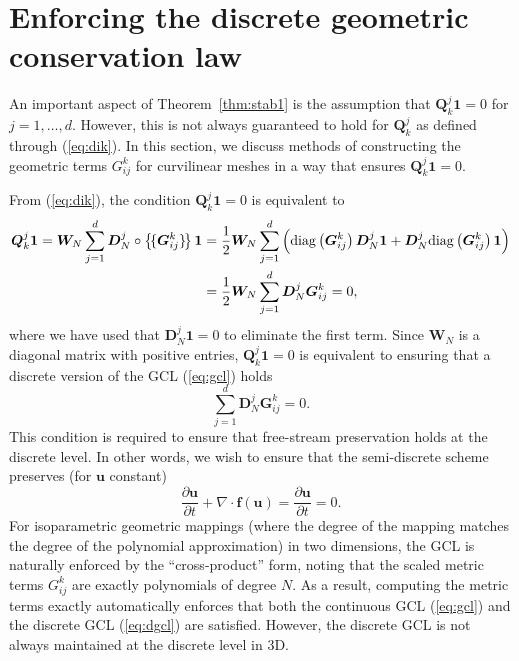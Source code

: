 \documentclass[10pt]{amsart}
\theoremstyle{definition}
\theoremstyle{lemma}
\theoremstyle{theorem}
\theoremstyle{assumption}
\newcommand{\pd}[2]{\frac{\partial#1}{\partial#2}}
\newcommand{\LRp}[1]{\left( #1 \right)}
\newcommand{\LRc}[1]{\left\{ #1 \right\}}
\newcommand{\avg}[1] {\ensuremath{\LRc{\!\{#1\}\!}}}
\newcommand{\Grad} {\ensuremath{\nabla}}
\newcommand{\diag}[1]{{\rm diag}\LRp{#1}}
\begin{document}
{\section{Enforcing the discrete geometric conservation law}
\label{sec:4}
An important aspect of Theorem~\ref{thm:stab1} is the assumption that $\bm{Q}^j_k\bm{1} = 0$ for $j = 1,\ldots,d$.  However, this is not always guaranteed to hold for $\bm{Q}^j_k$ as defined through (\ref{eq:dik}).  In this section, we discuss methods of constructing the geometric terms $G^k_{ij}$ for curvilinear meshes in a way that ensures $\bm{Q}^j_k\bm{1} = 0$.  

From (\ref{eq:dik}), the condition $\bm{Q}^j_k\bm{1} = 0$ is equivalent to
\begin{align*}
\bm{Q}^j_k\bm{1} = \bm{W}_N\sum_{j=1}^d\bm{D}^j_N\circ \avg{\bm{G}_{ij}^k}\bm{1} &= \frac{1}{2}\bm{W}_N\sum_{j=1}^d \LRp{ \diag{\bm{G}_{ij}^k}\bm{D}^j_N \bm{1} + \bm{D}^j_N\diag{\bm{G}_{ij}^k}\bm{1}} \\
&= \frac{1}{2}\bm{W}_N\sum_{j=1}^d \bm{D}^j_N \bm{G}_{ij}^k = 0,
\end{align*}
where we have used that $\bm{D}^j_N \bm{1} = 0$ to eliminate the first term.  Since $\bm{W}_N$ is a diagonal matrix with positive entries, $\bm{Q}^j_k\bm{1} = 0$ is equivalent to ensuring that a discrete version of the GCL (\ref{eq:gcl}) holds
\begin{equation}
\sum_{j=1}^d \bm{D}^j_N \bm{G}_{ij}^k = 0.
\label{eq:dgcl}
\end{equation}
This condition is required to ensure that free-stream preservation holds at the discrete level.  In other words, we wish to ensure that the semi-discrete scheme preserves (for $\bm{u}$ constant) 
\[
\pd{\bm{u}}{t} + \Grad \cdot \bm{f}(\bm{u}) = \pd{\bm{u}}{t} = 0.
\]
For isoparametric geometric mappings (where the degree of the mapping matches the degree of the polynomial approximation) in two dimensions, the GCL is naturally enforced by the ``cross-product'' form, noting that the scaled metric terms $G^k_{ij}$ are exactly polynomials of degree $N$.  As a result, computing the metric terms exactly automatically enforces that both the continuous GCL (\ref{eq:gcl}) and the discrete GCL (\ref{eq:dgcl}) are satisfied.  However, the discrete GCL is not always maintained at the discrete level in 3D.  

}
\end{document}
